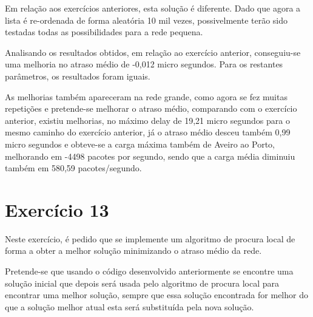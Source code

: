 \documentclass[pdftex,12pt,a4paper]{report}
\begin{document}


Em relação aos exercícios anteriores, esta solução é diferente. Dado que agora a lista é re-ordenada de forma aleatória 10 mil vezes, possivelmente terão sido testadas todas as possibilidades para a rede pequena.





Analisando os resultados obtidos, em relação ao exercício anterior, conseguiu-se uma melhoria no atraso médio de -0,012 micro segundos. Para os restantes parâmetros, os resultados foram iguais.







As melhorias também apareceram na rede grande, como agora se fez muitas repetições e pretende-se melhorar o atraso médio, comparando com o exercício anterior, existiu melhorias, no máximo delay de 19,21 micro segundos para o mesmo caminho do exercício anterior, já o atraso médio desceu também 0,99 micro segundos e obteve-se a carga máxima também de Aveiro ao Porto, melhorando em -4498 pacotes por segundo, sendo que a carga média diminuiu também em 580,59 pacotes/segundo.

\section{Exercício 13}

Neste exercício, é pedido que se implemente um algoritmo de procura local de forma a obter a melhor solução minimizando o atraso médio da rede.

Pretende-se que usando o código desenvolvido anteriormente se encontre uma solução inicial que depois será usada pelo algoritmo de procura local para encontrar uma melhor solução, sempre que essa solução encontrada for melhor do que a solução melhor atual esta será substituída pela nova solução.
\end{document}
